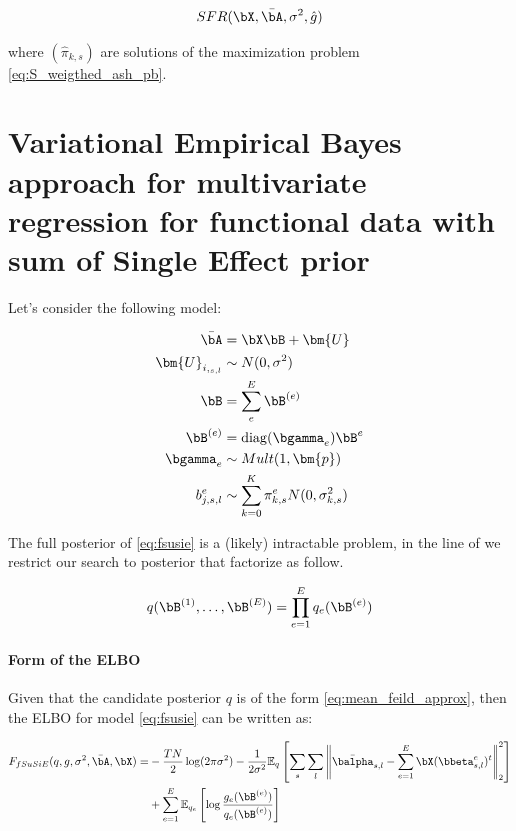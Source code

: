 \begin{align}
 SFR(\bX,\bar{\bA},\sigma^2,\hat g)
\end{align}

  where $(\hat\pi_{k,s})$ are solutions of the maximization problem \ref{eq:S_weigthed_ash_pb}.








  
\section{Variational Empirical Bayes approach for multivariate regression for  functional data with sum of Single Effect prior}\label{sec:fSuSIE}
Let's consider the following model:



 \begin{align}\label{eq:fsusie}
    \bar{\bA} &= \bX\bB+\bm{U}\\
    \bm{U}_{i,_{s,l}} &\sim N(0,\sigma^2)\\
    \bB &=  \sum_e^E\bB^{(e)} \\
    \bB^{(e)}&=\operatorname{diag}(\bgamma_e)\bB^e  \\
    \bgamma_e & \sim Mult(1, \bm{p})\\
    b^e_{j,{s,l}} &\sim  \sum_{k=0}^{K} \pi^e_{k,s} N(0,\sigma_{k,s}^2)
\end{align}



 
 
The full posterior of  \ref{eq:fsusie}  is a (likely) intractable problem, in the line of \cite{wang_simple_2020} we restrict our search to posterior that factorize as follow.
 
 \begin{align}\label{eq:mean_feild_approx}
  q(\bB^{(1)},\ldots ,\bB^{(E)})= \prod_{e=1}^E q_e(\bB^{(e)})   
 \end{align}
 

  \paragraph{Form of the  ELBO} Given that the candidate posterior   $q$ is of the form \ref{eq:mean_feild_approx}, then the  ELBO  for model \ref{eq:fsusie} can be written as:
 
 \begin{align}\label{eq:elbo_frorm_mean_feild}
     F_{fSuSiE}(q, g,\sigma^2, \bar{\bA}, \bX) = &-\frac{T N}{2}\log(2\pi\sigma^2) - \frac{1}{2\sigma^2}\mathbb{E}_{q}\left[ \sum_s\sum_l \left\| \bar{\balpha}_{s,l} - \sum_{e=1}^E \bX (\bbeta^e_{s,l})^{t} \right\|_2^2  \right] \\&+ \sum_{e=1}^E \mathbb{E}_{q_{e}}\left[  \log \frac{g_e(\bB^{(e)})}{q_{e}(\bB^{(e)})}\right]
\end{align}
 
